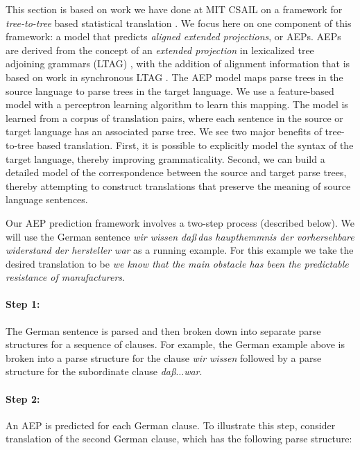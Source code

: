 \documentclass[11pt]{report}
\theoremstyle{plain}
\begin{document}
{This section is based on work we have done at MIT CSAIL on a framework
for {\em tree-to-tree} based statistical translation .
We focus here on one component of this framework: a model that
predicts {\em aligned extended projections}, or AEPs. AEPs are derived
from the concept of an {\em extended projection} in lexicalized tree
adjoining grammars (LTAG) , with the addition of
alignment information that is based on work in synchronous LTAG
. The AEP model maps parse trees in the source
language to parse trees in the target language. We use a feature-based
model with a perceptron learning algorithm to learn this mapping. The
model is learned from a corpus of translation pairs, where each
sentence in the source or target language has an associated parse
tree.  We see two major benefits of tree-to-tree based
translation. First, it is possible to explicitly model the syntax of
the target language, thereby improving grammaticality. Second, we can
build a detailed model of the correspondence between the source and
target parse trees, thereby attempting to construct translations that
preserve the meaning of source language sentences.

Our AEP prediction framework involves a two-step process (described
below). We will use the German sentence {\em wir wissen da\ss\,das
haupthemmnis der vorhersehbare widerstand der hersteller war} as a
running example. For this example we take the desired translation to
be {\em we know that the main obstacle has been the predictable
resistance of manufacturers}.

\paragraph{Step 1:} The German sentence is parsed and then broken
down into separate parse structures for a sequence of clauses. For
example, the German example above is broken into a parse structure for
the clause {\em wir wissen} followed by a parse structure for the
subordinate clause {\em da\ss $\ldots$war}.

\paragraph{Step 2:} An AEP is predicted for
each German clause. To illustrate this step, consider translation of
the second German clause, which has the following parse structure:

}
\end{document}

